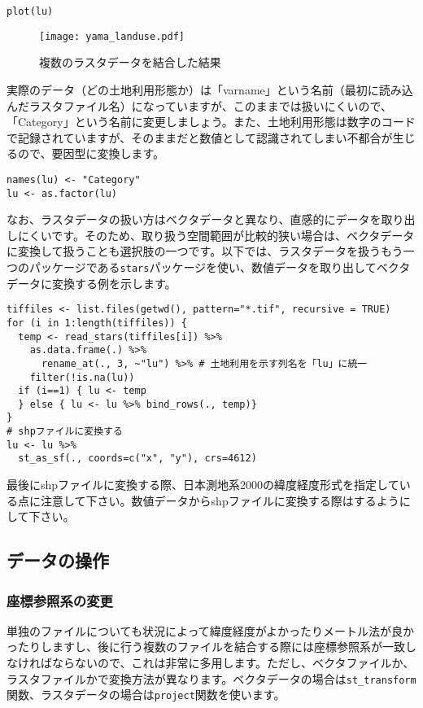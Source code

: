 \begin{verbatim}
plot(lu)
\end{verbatim}
\begin{figure}[htb]
\begin{center}
\graphicspath{{2_gis/figs/}}
\texttt{[image: yama\_landuse.pdf]}\\
\caption{複数のラスタデータを結合した結果}
\label{yama_landuse}
\end{center}
\end{figure}

\clearpage
実際のデータ（どの土地利用形態か）は「varname」という名前（最初に読み込んだラスタファイル名）になっていますが、このままでは扱いにくいので、「Category」という名前に変更しましょう。また、土地利用形態は数字のコードで記録されていますが、そのままだと数値として認識されてしまい不都合が生じるので、要因型に変換します。

\begin{verbatim}
names(lu) <- "Category"
lu <- as.factor(lu)
\end{verbatim}

なお、ラスタデータの扱い方はベクタデータと異なり、直感的にデータを取り出しにくいです。そのため、取り扱う空間範囲が比較的狭い場合は、ベクタデータに変換して扱うことも選択肢の一つです。以下では、ラスタデータを扱うもう一つのパッケージである\verb|stars|パッケージを使い、数値データを取り出してベクタデータに変換する例を示します。
\begin{verbatim}
tiffiles <- list.files(getwd(), pattern="*.tif", recursive = TRUE)
for (i in 1:length(tiffiles)) {
  temp <- read_stars(tiffiles[i]) %>%
    as.data.frame(.) %>%
	  rename_at(., 3, ~"lu") %>% # 土地利用を示す列名を「lu」に統一
    filter(!is.na(lu))
  if (i==1) { lu <- temp
  } else { lu <- lu %>% bind_rows(., temp)}
}
# shpファイルに変換する
lu <- lu %>%
  st_as_sf(., coords=c("x", "y"), crs=4612)
\end{verbatim}
最後にshpファイルに変換する際、日本測地系2000の緯度経度形式を指定している点に注意して下さい。数値データからshpファイルに変換する際はするようにして下さい。

  \subsection{データの操作}
\subsubsection{座標参照系の変更}
単独のファイルについても状況によって緯度経度がよかったりメートル法が良かったりしますし、後に行う複数のファイルを結合する際には座標参照系が一致しなければならないので、これは非常に多用します。ただし、ベクタファイルか、ラスタファイルかで変換方法が異なります。ベクタデータの場合は\texttt{st\_transform}関数、ラスタデータの場合は\texttt{project}関数を使います。

